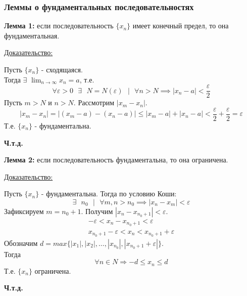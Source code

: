 \documentclass[12pt]{article}
\def\posl#1#2{\{#1_{#2}\}}
\begin{document}
    \subsubsection*{Леммы о фундаментальных последовательностях}
    \noindent \textbf{Лемма 1:} если последовательность $\{x_n\}$ имеет конечный предел, то она фундаментальная.\par\noindent
    \underline{Доказательство:}
    \begin{adjustwidth}{1.5em}{1.5em}
        Пусть $\posl{x}{n}$ - сходящаяся.\\
        Тогда $\exists$ $\lim_{n\to\infty}x_n = a$, т.е.
        \[ \forall \varepsilon > 0 \text{ } \exists \text{ } N = N(\varepsilon) \text{ } \big| \text{ } \forall n > N \implies |x_{n} - a| < \frac{\varepsilon}{2} \]
        Пусть $m > N$ и $n > N$. Рассмотрим $|x_m - x_n|$.
        \[
            |x_m - x_n| = |(x_m - a) - (x_n - a)| \le |x_m - a| + |x_n - a| < \frac{\varepsilon}{2} + \frac{\varepsilon}{2} = \varepsilon
        \]
        Т.е. $\posl{x}{n}$ - фундаментальна.
        \begin{center}
            \textbf{Ч.т.д.}
        \end{center}
    \end{adjustwidth}

    \noindent \textbf{Лемма 2:} если последовательность фундаментальна, то она ограничена.\par\noindent
    \underline{Доказательство:}\par
    \begin{adjustwidth}{1.5em}{1.5em}
        Пусть $\posl{x}{n}$ - фундаментальна. Тогда по условию Коши:
        \[ \exists \text{ } n_0 \text{ } \big| \text{ } \forall m,n > n_0 \implies |x_n - x_m| < \varepsilon \]
        Зафиксируем $m = n_0 + 1$. Получим $|x_n - x_{n_0+1}| < \varepsilon$.
        \begin{gather*}
            -\varepsilon < x_n - x_{n_0 + 1} < \varepsilon\\
            x_{n_0 + 1} - \varepsilon < x_n <  x_{n_0 + 1} + \varepsilon
        \end{gather*}
        Обозначим $d = max\{|x_1|, |x_2|, \dots, |x_{n_0}|, |x_{n_0+1} + \varepsilon|\}$.\\
        Тогда
        \[ \forall n \in N \Rightarrow -d \le x_n \le d \]
        Т.е. $\posl{x}{n}$ ограничена.
        \begin{center}
            \textbf{Ч.т.д.}
        \end{center}
    \end{adjustwidth}
\end{document}
